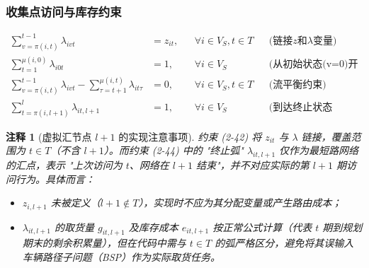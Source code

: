 \documentclass{article}
\newtheorem{remark}{注释}
\begin{document}
\subsubsection{收集点访问与库存约束}
\vspace{-1.5ex}
\begin{align}
\sum_{v=\pi(i,t)}^{t-1} \lambda_{ivt} &= z_{it}, && \forall i \in V_S, t \in T && \text{(链接$z$和$\lambda$变量)} \\
\sum_{t=1}^{\mu(i,0)} \lambda_{i0t} &= 1, && \forall i \in V_S && \text{(从初始状态(v=0)开始)} \\
\sum_{v=\pi(i,t)}^{t-1} \lambda_{ivt} - \sum_{\tau=t+1}^{\mu(i,t)} \lambda_{it\tau} &= 0, && \forall i \in V_S, t \in T && \text{(流平衡约束)} \\
\sum_{t=\pi(i,l+1)}^{l} \lambda_{it,l+1} &= 1, && \forall i \in V_S && \text{(到达终止状态(t=l+1))}
\end{align}

\begin{remark}[虚拟汇节点 $l+1$ 的实现注意事项]
约束 (2-42) 将 $z_{it}$ 与 $\lambda$ 链接，覆盖范围为 $t\in T$（不含 $l+1$）。而约束 (2-44) 中的 "终止弧" $\lambda_{it,l+1}$ 仅作为最短路网络的汇点，表示 "上次访问为 $t$、网络在 $l+1$ 结束"，并不对应实际的第 $l+1$ 期访问行为。具体而言：
\begin{itemize}
  \item $z_{i,l+1}$ 未被定义（$l+1\notin T$），实现时不应为其分配变量或产生路由成本；
  \item $\lambda_{it,l+1}$ 的取货量 $g_{it,l+1}$ 及库存成本 $e_{it,l+1}$ 按正常公式计算（代表 $t$ 期到规划期末的剩余积累量），但在代码中需与 $t\in T$ 的弧严格区分，避免将其误输入车辆路径子问题（BSP）作为实际取货任务。
\end{itemize}
\end{remark}
\end{document}
